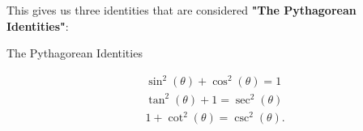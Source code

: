 This gives us three identities that are considered \textbf{"The Pythagorean
Identities"}:

\begin{tcolorbox}
  \begin{center}
    The Pythagorean Identities
  \end{center}
  \begin{align*}
    &\sin^{2} (\theta) + \cos^{2} (\theta) = 1 \\
    &\tan^{2} (\theta) + 1 = \sec^{2} (\theta) \\
    &1 + \cot^{2} (\theta) = \csc^{2} (\theta)
  .\end{align*}
\end{tcolorbox}

\newpage
